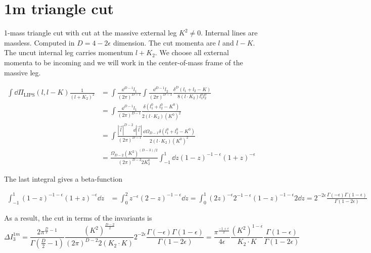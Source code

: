 \section{1m triangle cut}
1-mass triangle cut with cut at the massive external leg $K^2 \neq 0$.
Internal lines are massless. 
Computed in $D=4-2\epsilon$ dimension.
The cut momenta are $l$ and $l-K$.
The uncut internal leg carries momentum $l + K_2$. 
We choose all external momenta to be incoming and we will work in the center-of-mass frame of the massive leg.

\begin{equation*}
\begin{split}
\int\dd \Pi_{\textrm{LIPS}}(l, l-K) \frac{1}{(l+K_2)^2} & =
\int\frac{\dd^{D-1}l_1}{(2\pi)^{D-1}}\int\frac{\dd^{D-1}l_2}{(2\pi)^{D-1}}
\frac{\delta^{D}(l_1 + l_2 - K)}{8(l\cdot K_2)l_1^0 l_2^0}
\\
& = \int\frac{\dd^{D-1}l_1}{(2\pi)^{D-1}}\frac{\delta(l_1^0 + l_2^0 - K^0)}{2(l\cdot K_2)(K^0)^2} 
\\
& = \int\frac{|\vec{l}|^{D-2}\dd |\vec{l}|}{(2\pi)^{D-1}} \frac{\dd\Omega_{D-1}\delta(l_1^0 + l_2^0 - K^0)}{2 ( l \cdot K_2)(K^0)^2}
\\
& = \frac{\Omega_{D-2}(K^2)^{(D-3)/2}}{(2\pi)^{D-2}2K_2^0} \int_{-1}^1\dd z (1-z)^{-1-\epsilon}(1+z)^{-\epsilon}
\end{split} 
\end{equation*}

The last integral gives a beta-function

\begin{equation*}
\begin{split}
\int^1_{-1} (1-z)^{-1-\epsilon}(1+z)^{-\epsilon} \dd z & = 
\int^2_{0} z^{-\epsilon}(2-z)^{-1-\epsilon} \dd z 
=\int^1_0(2z)^{-\epsilon} 2^{-1-\epsilon} (1-z)^{-1-\epsilon} 2 \dd z
=2^{-2\epsilon}\frac{\Gamma(-\epsilon)\Gamma(1-\epsilon)}{\Gamma(1-2\epsilon)}
\end{split}
\end{equation*}

As a result, the cut in terms of the invariants is
\begin{equation*}
\Delta I_3^{1m} = 
\frac{2\pi^{\frac{D}{2}-1}}{\Gamma(\frac{D}{2}-1)}\frac{(K^2)^{\frac{D-2}{2}}}{(2\pi)^{D-2}2(K_2\cdot K)} 2^{-2\epsilon}\frac{\Gamma(-\epsilon)\Gamma(1-\epsilon)}{\Gamma(1-2\epsilon)}
=
\frac{\pi^{\frac{-1+\epsilon}{2}}}{4\epsilon}\frac{(K^{2})^{1-\epsilon}}{K_2\cdot K}\frac{\Gamma(1-\epsilon)}{\Gamma(1-2\epsilon)}
\end{equation*}